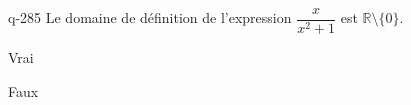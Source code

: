 \begin{truefalse}{q-285}
Le domaine de définition de l'expression $\dfrac{x}{x^2+1}$ est $\mathbb R \setminus \{0\}$.
\item Vrai
\item* Faux
\end{truefalse}

